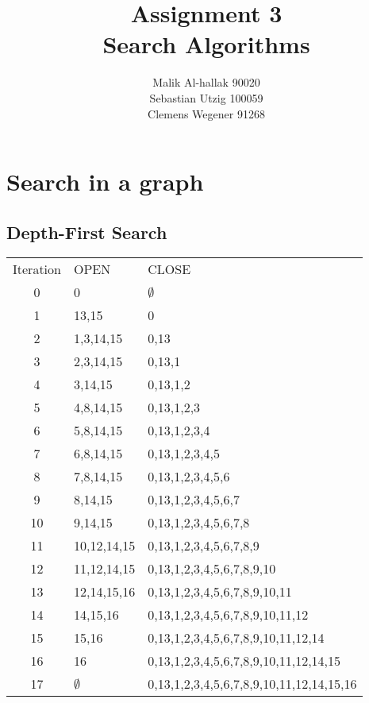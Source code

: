 \documentclass[11pt]{article}
\title{\textbf{Assignment 3\\}Search Algorithms}
\author{Malik Al-hallak 90020\\
		Sebastian Utzig 100059\\
		Clemens Wegener 91268}
\date{}
\begin{document}
\maketitle
\section{Search in a graph}
\subsection{Depth-First Search}
\begin{tabular}{ c | l | l }
  Iteration & OPEN & CLOSE \\
  0 	&	0				&	$\emptyset$ \\
  1		&	13,15			&	0\\
  2		&	1,3,14,15		&	0,13\\
  3		&	2,3,14,15		&	0,13,1\\
  4		&	3,14,15			&	0,13,1,2\\
  5		&	4,8,14,15		&	0,13,1,2,3\\
  6		&	5,8,14,15		&	0,13,1,2,3,4\\
  7		&	6,8,14,15		&	0,13,1,2,3,4,5\\
  8		&	7,8,14,15		&	0,13,1,2,3,4,5,6\\
  9		&	8,14,15			&	0,13,1,2,3,4,5,6,7\\
  10	&	9,14,15			&	0,13,1,2,3,4,5,6,7,8\\
  11	&	10,12,14,15		&	0,13,1,2,3,4,5,6,7,8,9\\
  12	&	11,12,14,15		&	0,13,1,2,3,4,5,6,7,8,9,10\\
  13	&	12,14,15,16		&	0,13,1,2,3,4,5,6,7,8,9,10,11\\
  14	&	14,15,16		&	0,13,1,2,3,4,5,6,7,8,9,10,11,12\\
  15	&	15,16			&	0,13,1,2,3,4,5,6,7,8,9,10,11,12,14\\
  16	&	16				&	0,13,1,2,3,4,5,6,7,8,9,10,11,12,14,15\\
  17	&	$\emptyset$		&	0,13,1,2,3,4,5,6,7,8,9,10,11,12,14,15,16
 \end{tabular}
\end{document}

